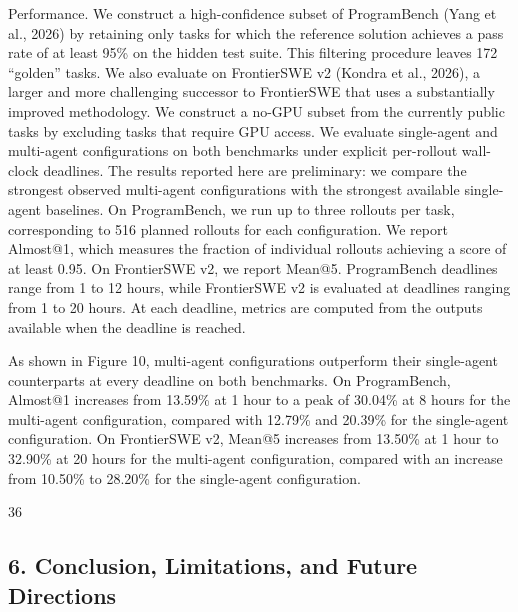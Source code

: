 \documentclass[
  10
]{article}
\begin{document}
Performance. We construct a high-confidence subset of ProgramBench (Yang
et al., 2026) by retaining only tasks for which the reference solution
achieves a pass rate of at least 95\% on the hidden test suite. This
filtering procedure leaves 172 ``golden'' tasks. We also evaluate on
FrontierSWE v2 (Kondra et al., 2026), a larger and more challenging
successor to FrontierSWE that uses a substantially improved methodology.
We construct a no-GPU subset from the currently public tasks by
excluding tasks that require GPU access. We evaluate single-agent and
multi-agent configurations on both benchmarks under explicit per-rollout
wall-clock deadlines. The results reported here are preliminary: we
compare the strongest observed multi-agent configurations with the
strongest available single-agent baselines. On ProgramBench, we run up
to three rollouts per task, corresponding to 516 planned rollouts for
each configuration. We report Almost@1, which measures the fraction of
individual rollouts achieving a score of at least 0.95. On FrontierSWE
v2, we report Mean@5. ProgramBench deadlines range from 1 to 12 hours,
while FrontierSWE v2 is evaluated at deadlines ranging from 1 to 20
hours. At each deadline, metrics are computed from the outputs available
when the deadline is reached.

As shown in Figure 10, multi-agent configurations outperform their
single-agent counterparts at every deadline on both benchmarks. On
ProgramBench, Almost@1 increases from 13.59\% at 1 hour to a peak of
30.04\% at 8 hours for the multi-agent configuration, compared with
12.79\% and 20.39\% for the single-agent configuration. On FrontierSWE
v2, Mean@5 increases from 13.50\% at 1 hour to 32.90\% at 20 hours for
the multi-agent configuration, compared with an increase from 10.50\% to
28.20\% for the single-agent configuration.

36

\subsection{6. Conclusion, Limitations, and Future
Directions}\label{conclusion-limitations-and-future-directions}
\end{document}
